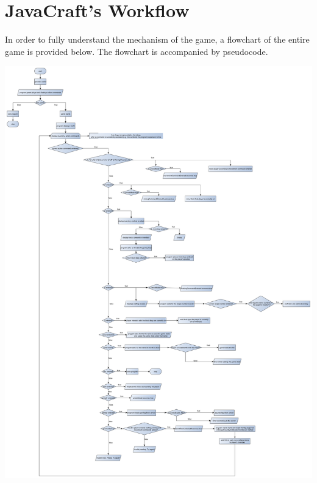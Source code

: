 \section{JavaCraft's Workflow} \label{section: javacraft workflow}
In order to fully understand the mechanism of the game, a flowchart of the entire game is provided below. The flowchart is accompanied by pseudocode.

{\includegraphics[width=\textwidth,height=\textheight,keepaspectratio]{../flowchart/WorkFlow_of_JavaCraft.png}}

